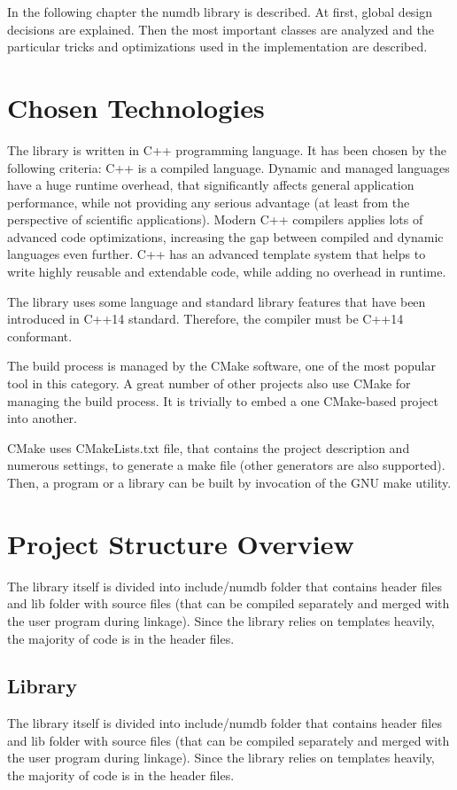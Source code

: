 In the following chapter the numdb library is described. At first, global design decisions are explained. Then the most important classes are analyzed and the particular tricks and optimizations used in the implementation are described.

\section{Chosen Technologies}

The library is written in C++ programming language. It has been chosen by the following criteria:
C++ is a compiled language. Dynamic and managed languages have a huge runtime overhead, that significantly affects general application performance, while not providing any serious advantage (at least from the perspective of scientific applications).
Modern C++ compilers applies lots of advanced code optimizations, increasing the gap between compiled and dynamic languages even further.
C++ has an advanced template system that helps to write highly reusable and extendable code, while adding no overhead in runtime.

The library uses some language and standard library features that have been introduced in C++14 standard. Therefore, the compiler must be C++14 conformant.

The build process is managed by the CMake software, one of the most popular tool in this category. A great number of other projects also use CMake for managing the build process. It is trivially to embed a one CMake-based project into another.

CMake uses CMakeLists.txt file, that contains the project description and numerous settings, to generate a make file (other generators are also supported). Then, a program or a library can be built by invocation of the GNU make utility.

\section{Project Structure Overview}
The library itself is divided into include/numdb folder that contains header files and lib folder with source files (that can be compiled separately and merged with the user program during linkage). Since the library relies on templates heavily, the majority of code is in the header files.

\subsection{Library}
The library itself is divided into include/numdb folder that contains header files and lib folder with source files (that can be compiled separately and merged with the user program during linkage). Since the library relies on templates heavily, the majority of code is in the header files.

